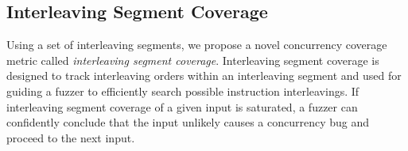 % 



\subsection{Interleaving Segment Coverage}
\label{ss:coverage}

\newcommand{\intcov}{interleaving segment coverage\xspace}
\newcommand{\Intcov}{Interleaving segment coverage\xspace}


Using a set of interleaving segments, we propose a novel concurrency coverage metric called \textit{\intcov}.
\Intcov is designed to track interleaving orders
within an interleaving segment and used for guiding a fuzzer to  
efficiently search possible instruction interleavings.
If \intcov of a given input is saturated, 
a fuzzer can confidently conclude that the input unlikely causes a concurrency bug and proceed to the next input.

